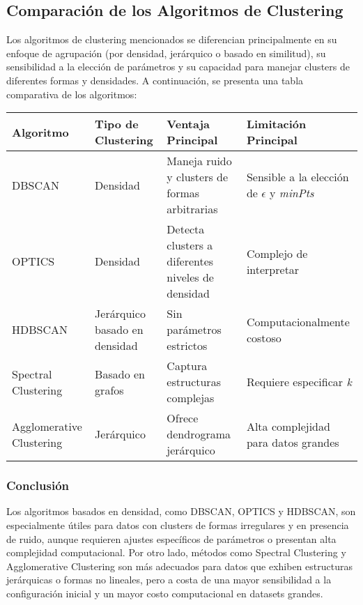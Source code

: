 \subsection*{Comparación de los Algoritmos de Clustering}

Los algoritmos de clustering mencionados se diferencian principalmente en su enfoque de agrupación (por densidad, jerárquico o basado en similitud), su sensibilidad a la elección de parámetros y su capacidad para manejar clusters de diferentes formas y densidades. A continuación, se presenta una tabla comparativa de los algoritmos:

\begin{table}[ht]
\centering
\begin{tabular}{|p{2.2cm}|p{2.2cm}|p{3.7cm}|p{4cm}|}
\hline
\textbf{Algoritmo} & \textbf{Tipo de Clustering} & \textbf{Ventaja Principal} & \textbf{Limitación Principal} \\
\hline
DBSCAN & Densidad & Maneja ruido y clusters de formas arbitrarias & Sensible a la elección de \(\epsilon\) y \textit{minPts} \\
OPTICS & Densidad & Detecta clusters a diferentes niveles de densidad & Complejo de interpretar \\
HDBSCAN & Jerárquico basado en densidad & Sin parámetros estrictos & Computacionalmente costoso \\
Spectral Clustering & Basado en grafos & Captura estructuras complejas & Requiere especificar \textit{k} \\
Agglomerative Clustering & Jerárquico & Ofrece dendrograma jerárquico & Alta complejidad para datos grandes \\
\hline
\end{tabular}
\end{table}

\subsubsection*{Conclusión}

Los algoritmos basados en densidad, como DBSCAN, OPTICS y HDBSCAN, son especialmente útiles para datos con clusters de formas irregulares y en presencia de ruido, aunque requieren ajustes específicos de parámetros o presentan alta complejidad computacional. Por otro lado, métodos como Spectral Clustering y Agglomerative Clustering son más adecuados para datos que exhiben estructuras jerárquicas o formas no lineales, pero a costa de una mayor sensibilidad a la configuración inicial y un mayor costo computacional en datasets grandes.

